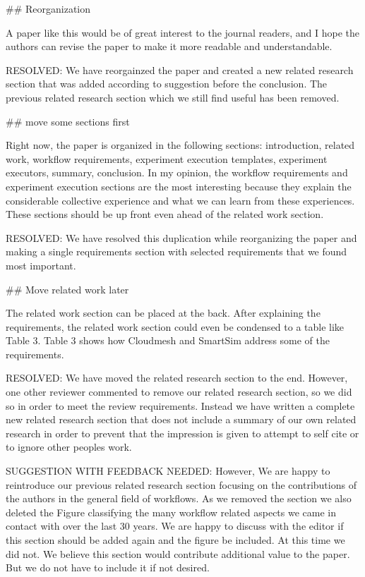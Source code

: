 ## Reorganization

A paper like this would be of great interest to the journal readers, and I hope the authors can revise the paper to make it more readable and understandable.

    RESOLVED: We have reorgainzed the paper and created a new related research section that was added according to suggestion before the conclusion. The previous related research section which we still find useful has been removed. 

## move some sections first

Right now, the paper is organized in the following sections: introduction, related work, workflow requirements, experiment execution templates, experiment executors, summary, conclusion. In my opinion, the workflow requirements and experiment execution sections are the most interesting because they explain the considerable collective experience and what we can learn from these experiences. These sections should be up front even ahead of the related work section. 

    RESOLVED: We have resolved this duplication while reorganizing the paper and making a single requirements section with selected requirements that we found most important. 
    
    
## Move related work later

The related work section can be placed at the back. After explaining the requirements, the related work section could even be condensed to a table like Table 3. Table 3 shows how Cloudmesh and SmartSim address some of the requirements. 

    RESOLVED: We have moved the related research section to the end. However, one other reviewer commented to remove our related research section, so we did so in order to meet the review requirements. Instead we have written a complete new related research section that does not include a summary of our own related research in order to prevent that the impression is given to attempt to self cite or to ignore other peoples work.

    SUGGESTION WITH FEEDBACK NEEDED: However, We are happy to reintroduce our previous related research section focusing on the contributions of the authors in the general field of workflows. As we removed the section we also deleted the Figure classifying the many workflow related aspects we came in contact with over the last 30 years. We are happy to discuss with the editor if this section should be added again and the figure be included. At this time we did not. We believe this section would contribute additional value to the paper. But we do not have to include it if not desired.

